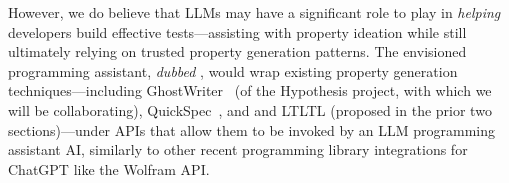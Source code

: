 
However, we do believe that LLMs may have a significant role to play
in {\em helping} developers build effective tests---assisting with
property ideation while still ultimately relying on trusted
property generation patterns.
The envisioned programming assistant, {\em dubbed \GhostChat}, would wrap existing property generation
techniques---including GhostWriter~\cite{ref:ghostwriter} (of the Hypothesis
project, with which we will be collaborating), QuickSpec~\cite{ref:claessen2010quickspec},
and \Mica{} and LTLTL (proposed in the prior two sections)---under APIs that allow them to be invoked by
an LLM programming assistant AI, similarly to other recent programming library
integrations for ChatGPT like the Wolfram API.

